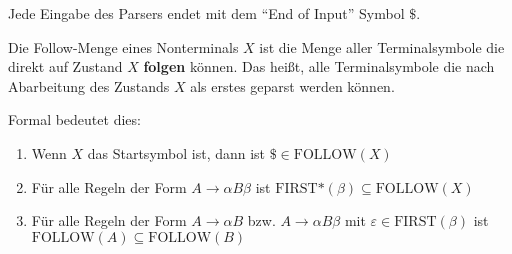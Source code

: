 \begin{defn}
Jede Eingabe des Parsers endet mit dem ``End of Input'' Symbol $\$$.
\end{defn}
\begin{defn}
Die Follow-Menge eines Nonterminals $X$ ist die Menge aller Terminalsymbole die direkt auf Zustand $X$ \textbf{folgen} können.
Das heißt, alle Terminalsymbole die nach Abarbeitung des Zustands $X$ als erstes geparst werden können.

Formal bedeutet dies:
\begin{enumerate}
\item Wenn $X$ das Startsymbol ist, dann ist $\$ \in \text{FOLLOW}(X)$
\item Für alle Regeln der Form $A \to \alpha B \beta$ ist $\text{FIRST*}(\beta) \subseteq \text{FOLLOW}(X)$
\item Für alle Regeln der Form $A \to \alpha B$ bzw. $A \to \alpha B \beta$ mit $\varepsilon \in \text{FIRST}(\beta)$
ist $\text{FOLLOW}(A) \subseteq \text{FOLLOW}(B)$
\end{enumerate}
\end{defn}
